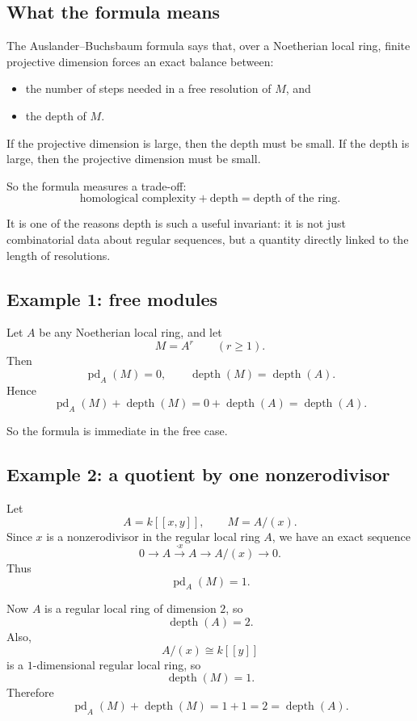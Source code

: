 \documentclass[12pt,a4paper]{article}
\theoremstyle{notespace}
\begin{document}
\subsection{What the formula means}

The Auslander--Buchsbaum formula says that, over a Noetherian local ring, finite projective dimension forces an exact balance between:
\begin{itemize}
	\item the number of steps needed in a free resolution of \(M\), and
	\item the depth of \(M\).
\end{itemize}

If the projective dimension is large, then the depth must be small.  
If the depth is large, then the projective dimension must be small.

So the formula measures a trade-off:
\[
\text{homological complexity} + \text{depth} = \text{depth of the ring}.
\]

It is one of the reasons depth is such a useful invariant: it is not just combinatorial data about regular sequences, but a quantity directly linked to the length of resolutions.

\subsection{Example 1: free modules}

Let \(A\) be any Noetherian local ring, and let
\[
M=A^r
\qquad (r\ge 1).
\]
Then
\[
\operatorname{pd}_A(M)=0,
\qquad
\operatorname{depth}(M)=\operatorname{depth}(A).
\]
Hence
\[
\operatorname{pd}_A(M)+\operatorname{depth}(M)
=
0+\operatorname{depth}(A)
=
\operatorname{depth}(A).
\]

So the formula is immediate in the free case.

\subsection{Example 2: a quotient by one nonzerodivisor}

Let
\[
A=k[[x,y]],
\qquad
M=A/(x).
\]
Since \(x\) is a nonzerodivisor in the regular local ring \(A\), we have an exact sequence
\[
0 \longrightarrow A \xrightarrow{\cdot x} A \longrightarrow A/(x) \longrightarrow 0.
\]
Thus
\[
\operatorname{pd}_A(M)=1.
\]

Now \(A\) is a regular local ring of dimension \(2\), so
\[
\operatorname{depth}(A)=2.
\]
Also,
\[
A/(x)\cong k[[y]]
\]
is a \(1\)-dimensional regular local ring, so
\[
\operatorname{depth}(M)=1.
\]
Therefore
\[
\operatorname{pd}_A(M)+\operatorname{depth}(M)=1+1=2=\operatorname{depth}(A).
\]
\end{document}
